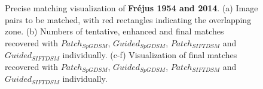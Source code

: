 \begin{figure}[htbp]
\begin{center}
{\begin{minipage}[t]{0.48\linewidth}
			\end{minipage}%
		}
		\caption{Precise matching visualization of \textbf{Fr{\'e}jus 1954 and 2014}. (a) Image pairs to be matched, with red rectangles indicating the overlapping zone. (b) Numbers of tentative, enhanced and final matches recovered with $Patch_{SpGDSM}$, $Guided_{SpGDSM}$, $Patch_{SIFTDSM}$ and $Guided_{SIFTDSM}$ individually. (c-f) Visualization of final matches recovered with $Patch_{SpGDSM}$, $Guided_{SpGDSM}$, $Patch_{SIFTDSM}$ and $Guided_{SIFTDSM}$ individually.}
		\label{MatchVizFrejus1954-2014}
	\end{center}
\end{figure} 


